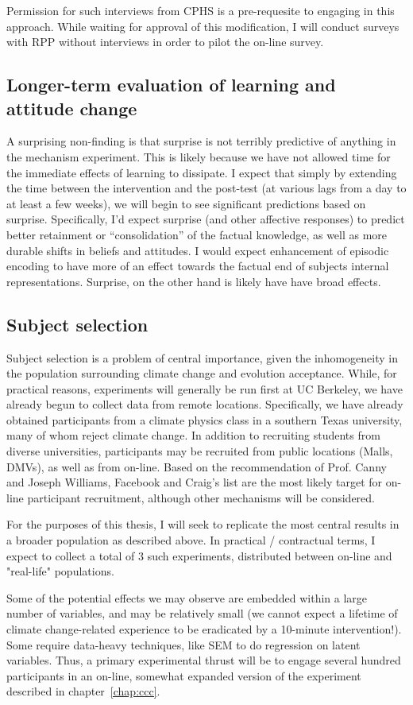 Permission for such interviews from CPHS is a pre-requesite to engaging in this
approach. While waiting for approval of this modification, I will conduct
surveys with RPP without interviews in order to pilot the on-line survey.

\subsection{Longer-term evaluation of learning and attitude change}

A surprising non-finding is that surprise is not terribly predictive of anything
in the mechanism experiment. This is likely because we have not allowed time for
the immediate effects of learning to dissipate. I expect that simply by
extending the time between the intervention and the post-test (at various lags
from a day to at least a few weeks), we will begin to see significant
predictions based on surprise. Specifically, I'd expect surprise (and other
affective responses) to predict better retainment or ``consolidation'' of the
factual knowledge, as well as more durable shifts in beliefs and attitudes. I
would expect enhancement of episodic encoding to have more of an effect towards
the factual end of subjects internal representations. Surprise, on the other
hand is likely have have broad effects.

\subsection{Subject selection}

Subject selection is a problem of central importance, given the inhomogeneity in
the population surrounding climate change and evolution acceptance. While, for
practical reasons, experiments will generally be run first at UC Berkeley, we
have already begun to collect data from remote locations. Specifically, we have
already obtained participants from a climate physics class in a southern Texas
university, many of whom reject climate change. In addition to recruiting
students from diverse universities, participants may be recruited from public
locations (Malls, DMVs), as well as from on-line. Based on the recommendation of
Prof. Canny and Joseph Williams, Facebook and Craig's list are the most likely
target for on-line participant recruitment, although other mechanisms will be
considered.

For the purposes of this thesis, I will seek to replicate the most central
results in a broader population as described above. In practical / contractual
terms, I expect to collect a total of 3 such experiments, distributed between
on-line and "real-life" populations.

Some of the potential effects we may observe are embedded within a large number
of variables, and may be relatively small (we cannot expect a lifetime of
climate change-related experience to be eradicated by a 10-minute
intervention!). Some require data-heavy techniques, like SEM to do regression on
latent variables. Thus, a primary experimental thrust will be to engage several
hundred participants in an on-line, somewhat expanded version of the experiment
described in chapter~\ref{chap:ccc}.
